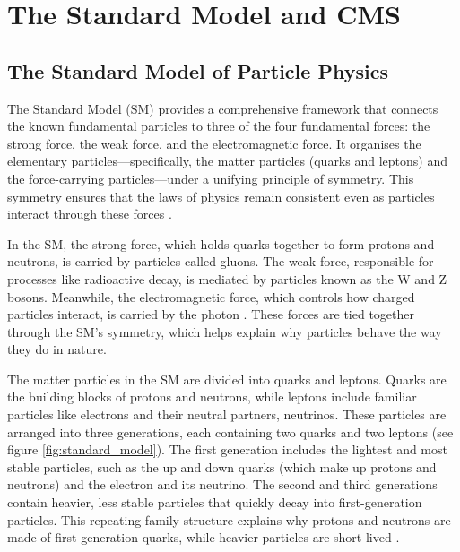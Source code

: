 \chapter{The Standard Model and CMS}


\section{The Standard Model of Particle Physics}

The Standard Model (SM) provides a comprehensive framework that connects the known fundamental particles to three of the four fundamental forces: the strong force, the weak force, and the electromagnetic force. It organises the elementary particles—specifically, the matter particles (quarks and leptons) and the force-carrying particles—under a unifying principle of symmetry. This symmetry ensures that the laws of physics remain consistent even as particles interact through these forces \cite{pich2012standardmodelelectroweakinteractions}.

In the SM, the strong force, which holds quarks together to form protons and neutrons, is carried by particles called gluons. The weak force, responsible for processes like radioactive decay, is mediated by particles known as the W and Z bosons. Meanwhile, the electromagnetic force, which controls how charged particles interact, is carried by the photon \cite{pich2012standardmodelelectroweakinteractions}. These forces are tied together through the SM’s symmetry, which helps explain why particles behave the way they do in nature.

The matter particles in the SM are divided into quarks and leptons. Quarks are the building blocks of protons and neutrons, while leptons include familiar particles like electrons and their neutral partners, neutrinos. These particles are arranged into three generations, each containing two quarks and two leptons (see figure \ref{fig:standard_model}). The first generation includes the lightest and most stable particles, such as the up and down quarks (which make up protons and neutrons) and the electron and its neutrino. The second and third generations contain heavier, less stable particles that quickly decay into first-generation particles. This repeating family structure explains why protons and neutrons are made of first-generation quarks, while heavier particles are short-lived \cite{cush:standard-model}.

